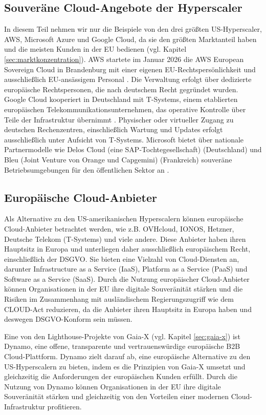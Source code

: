 \subsection{Souveräne Cloud-Angebote der Hyperscaler}
\label{sec:sovereignhyperscaler}
In diesem Teil nehmen wir nur die Beispiele von den drei größten US-Hyperscaler, \ac{AWS}, Microsoft Azure und Google Cloud, da sie den größten Marktanteil haben und die meisten Kunden in der EU bedienen (vgl. Kapitel \ref{sec:marktkonzentration}).
\ac{AWS} startete im Januar 2026 die \ac{AWS} European Sovereign 
Cloud in Brandenburg mit einer eigenen EU-Rechtspersönlichkeit 
und ausschließlich EU-ansässigem Personal \cite{aws_sovereign_cloud}. Die 
Verwaltung erfolgt über dedizierte europäische Rechtspersonen, 
die nach deutschem Recht gegründet wurden.
Google Cloud kooperiert in Deutschland mit T-Systems, einem etablierten europäischen Telekommunikationsunternehmen,
das operative Kontrolle über Teile der Infrastruktur 
übernimmt \cite{google_tsystems}. Physischer oder virtueller 
Zugang zu deutschen Rechenzentren, einschließlich 
Wartung und Updates erfolgt ausschließlich unter 
Aufsicht von T-Systems. Microsoft bietet 
über nationale Partnermodelle wie Delos Cloud (eine SAP-Tochtegesellschaft) (Deutschland) 
und Bleu (Joint Venture von Orange und Capgemini) (Frankreich) souveräne Betriebsumgebungen für 
den öffentlichen Sektor an \cite{microsoft_sovereign}. 

\subsection{Europäische Cloud-Anbieter}

Als Alternative zu den US-amerikanischen Hyperscalern können europäische Cloud-Anbieter betrachtet werden, wie z.B. OVHcloud, IONOS, Hetzner, Deutsche Telekom (T-Systems) und viele andere. Diese Anbieter haben ihren Hauptsitz in Europa und unterliegen daher ausschließlich europäischem Recht, einschließlich der \ac{DSGVO}. Sie bieten eine Vielzahl von Cloud-Diensten an, darunter Infrastructure as a Service (IaaS), Platform as a Service (PaaS) und Software as a Service (SaaS). Durch die Nutzung europäischer Cloud-Anbieter können Organisationen in der \ac{EU} ihre digitale Souveränität stärken und die Risiken im Zusammenhang mit ausländischem Regierungszugriff wie dem \ac{CLOUD-Act} reduzieren, da die Anbieter ihren Hauptsitz in Europa haben und deswegen \ac{DSGVO}-Konform sein müssen. 

Eine von den Lighthouse-Projekte von Gaia-X (vgl. Kapitel \ref{sec:gaia-x}) \cite{gaiax2022lighthouse,dynamo2026marketplace} ist Dynamo, eine offene, transparente und vertrauenswürdige europäische \ac{B2B} Cloud-Plattform. Dynamo zielt darauf ab, eine europäische Alternative zu den US-Hyperscalern zu bieten, indem es die Prinzipien von Gaia-X umsetzt und gleichzeitig die Anforderungen der europäischen Kunden erfüllt. Durch die Nutzung von Dynamo können Organisationen in der \ac{EU} ihre digitale Souveränität stärken und gleichzeitig von den Vorteilen einer modernen Cloud-Infrastruktur profitieren.